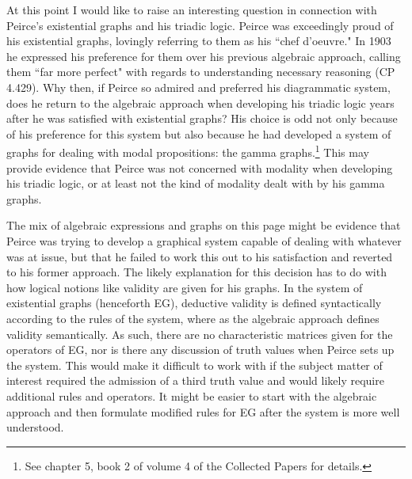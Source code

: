 \documentclass[12pt]{article}
\begin{document}
At this point I would like to raise an interesting question in connection with Peirce's existential graphs and his triadic logic. Peirce was exceedingly proud of his existential graphs, lovingly referring to them as his ``chef d'oeuvre." In 1903 he expressed his preference for them over his previous algebraic approach, calling them ``far more perfect" with regards to understanding necessary reasoning (CP 4.429). Why then, if Peirce so admired and preferred his diagrammatic system, does he return to the algebraic approach when developing his triadic logic years after he was satisfied with existential graphs? His choice is odd not only because of his preference for this system but also because he had developed a system of graphs for dealing with modal propositions: the gamma graphs.\footnote{See chapter 5, book 2 of volume 4 of the Collected Papers for details.} This may provide evidence that Peirce was not concerned with modality when developing his triadic logic, or at least not the kind of modality dealt with by his gamma graphs.

The mix of algebraic expressions and graphs on this page might be evidence that Peirce was trying to develop a graphical system capable of dealing with whatever was at issue, but that he failed to work this out to his satisfaction and reverted to his former approach. The likely explanation for this decision has to do with how logical notions like validity are given for his graphs. In the system of existential graphs (henceforth EG), deductive validity is defined syntactically according to the rules of the system, where as the algebraic approach defines validity semantically. As such, there are no characteristic matrices given for the operators of EG, nor is there any discussion of truth values when Peirce sets up the system. This would make it difficult to work with if the subject matter of interest required the admission of a third truth value and would likely require additional rules and operators. It might be easier to start with the algebraic approach and then formulate modified rules for EG after the system is more well understood.
\end{document}
